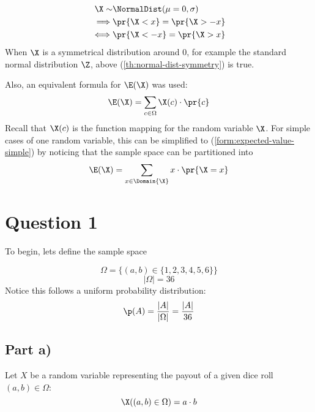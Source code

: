 \begin{equation}
\label{th:normal-dist-symmetry}
\begin{aligned}
	\X \sim &\NormalDist (\mu = 0, \sigma) \\
	\implies &\pr{\X < x} = \pr{\X > -x} \\
	\iff &\pr{\X < -x} = \pr{\X > x}
\end{aligned}
\end{equation}
When $\X$ is a symmetrical distribution around 0, for example the standard normal distribution $\Z$, above (\ref{th:normal-dist-symmetry}) is true.

Also, an equivalent formula for $\E (\X)$ was used:
\begin{equation}
\label{form:expected-value-general}
\E (\X) = \sum _{c \in \Omega} \X(c) \cdot \pr{c}
\end{equation}
Recall that $\X(c)$ is the function mapping for the random variable $\X$.
For simple cases of one random variable, this can be simplified to (\ref{form:expected-value-simple}) by noticing that the sample space can be partitioned into
\begin{equation}
\label{form:expected-value-simple}
\E(\X) = \sum _{x \in \Domain{\X}} x \cdot \pr{\X = x}
\end{equation}

\newpage

\section*{Question 1}

To begin, lets define the sample space

\[
\Omega = \{ (a, b) \in \{ 1, 2, 3, 4, 5, 6 \} \}
\]
\[
|\Omega| = 36
\]
Notice this follows a uniform probability distribution:
\begin{equation*}
\label{eq:q1-uniform-p}
\p (A) = \frac{|A|}{|\Omega|} = \frac{|A|}{36}
\end{equation*}


\subsection*{Part a)}

Let $X$ be a random variable representing the payout of a given dice roll $(a,b)\in \Omega$:
\[
\X ((a,b) \in \Omega) = a \cdot b
\]


